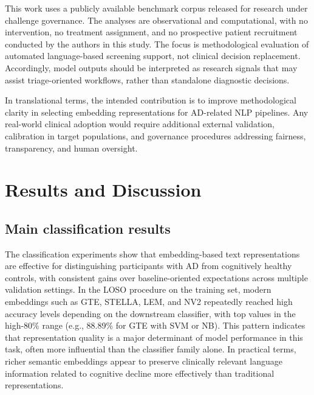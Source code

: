 \documentclass[final,5p,times]{elsarticle}
\begin{document}
This work uses a publicly available benchmark corpus released for research under challenge governance. The analyses are observational and computational, with no intervention, no treatment assignment, and no prospective patient recruitment conducted by the authors in this study. The focus is methodological evaluation of automated language-based screening support, not clinical decision replacement. Accordingly, model outputs should be interpreted as research signals that may assist triage-oriented workflows, rather than standalone diagnostic decisions.

In translational terms, the intended contribution is to improve methodological clarity in selecting embedding representations for AD-related NLP pipelines. Any real-world clinical adoption would require additional external validation, calibration in target populations, and governance procedures addressing fairness, transparency, and human oversight.

\section{Results and Discussion}
\label{sec:results_discussion}

\subsection{Main classification results}
\label{subsec:main_classification_results}

The classification experiments show that embedding-based text representations are effective for distinguishing participants with AD from cognitively healthy controls, with consistent gains over baseline-oriented expectations across multiple validation settings. In the LOSO procedure on the training set, modern embeddings such as GTE, STELLA, LEM, and NV2 repeatedly reached high accuracy levels depending on the downstream classifier, with top values in the high-80\% range (e.g., 88.89\% for GTE with SVM or NB). This pattern indicates that representation quality is a major determinant of model performance in this task, often more influential than the classifier family alone. In practical terms, richer semantic embeddings appear to preserve clinically relevant language information related to cognitive decline more effectively than traditional representations.
\end{document}
